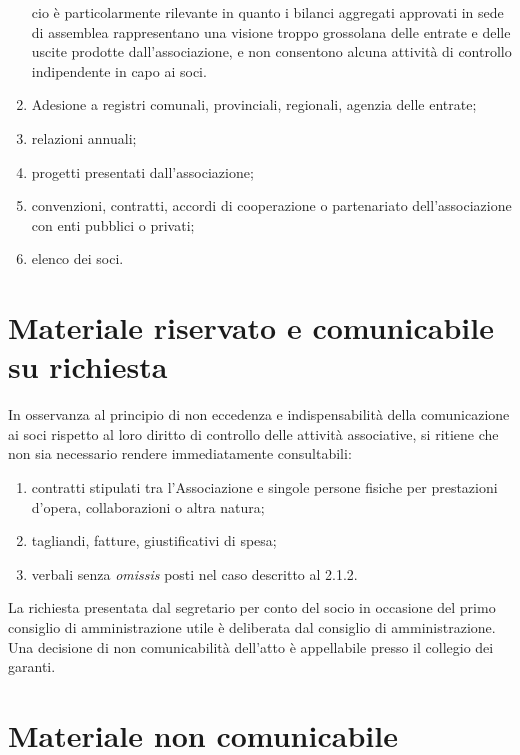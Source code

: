 \begin{enumerate}
\begin{itemize}
        \end{itemize}
        cio è particolarmente rilevante in quanto i bilanci aggregati
        approvati in sede di assemblea rappresentano una visione troppo
        grossolana delle entrate e delle uscite prodotte dall'associazione, e
        non consentono alcuna attività di controllo indipendente in capo ai
        soci.
    \item
        Adesione a registri comunali, provinciali, regionali, agenzia delle
        entrate;
    \item
        relazioni annuali;
    \item
        progetti presentati dall'associazione;
    \item
        convenzioni, contratti, accordi di cooperazione o partenariato
        dell'associazione con enti pubblici o privati;
    \item
        elenco dei soci.
\end{enumerate}

\section{Materiale riservato e comunicabile su
richiesta}\label{materiale-riservato-e-comunicabile-su-richiesta}

In osservanza al principio di non eccedenza e indispensabilità della
comunicazione ai soci rispetto al loro diritto di controllo delle
attività associative, si ritiene che non sia necessario rendere
immediatamente consultabili:

\begin{enumerate}
    \item
        contratti stipulati tra l'Associazione e singole persone fisiche per
        prestazioni d'opera, collaborazioni o altra natura;
    \item
        tagliandi, fatture, giustificativi di spesa;
    \item
        verbali senza \emph{omissis} posti nel caso descritto al 2.1.2.
\end{enumerate}

La richiesta presentata dal segretario per conto del socio in occasione
del primo consiglio di amministrazione utile è deliberata dal consiglio
di amministrazione. Una decisione di non comunicabilità dell'atto è
appellabile presso il collegio dei garanti.

\section{Materiale non comunicabile}\label{materiale-non-comunicabile}

